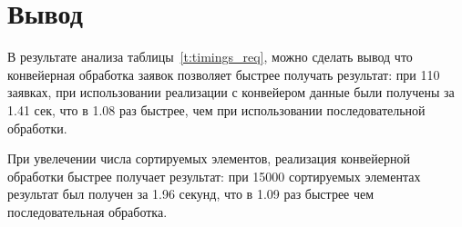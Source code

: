 \section*{Вывод}
В результате анализа таблицы~\ref{t:timings_req}, можно сделать вывод что конвейерная обработка заявок позволяет быстрее получать результат: при 110 заявках, при использовании реализации с конвейером данные были получены за 1.41 сек, что в 1.08 раз быстрее, чем при использовании последовательной обработки.

При увелечении числа сортируемых элементов, реализация конвейерной обработки быстрее получает результат: при 15000 сортируемых элементах результат был получен за 1.96 секунд, что в 1.09 раз быстрее чем последовательная обработка.
